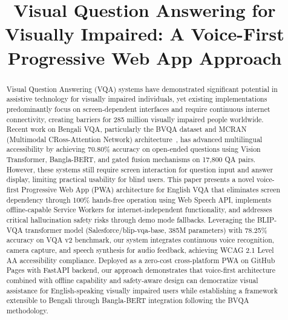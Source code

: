 \documentclass[conference]{IEEEtran}
\begin{document}
\title{Visual Question Answering for Visually Impaired: A Voice-First Progressive Web App Approach}

\author{
\and
{}
}

\maketitle

\begin{abstract}
Visual Question Answering (VQA) systems have demonstrated significant potential in assistive technology for visually impaired individuals, yet existing implementations predominantly focus on screen-dependent interfaces and require continuous internet connectivity, creating barriers for 285 million visually impaired people worldwide. Recent work on Bengali VQA, particularly the BVQA dataset and MCRAN (Multimodal CRoss-Attention Network) architecture~\cite{bvqa_2025}, has advanced multilingual accessibility by achieving 70.80\% accuracy on open-ended questions using Vision Transformer, Bangla-BERT, and gated fusion mechanisms on 17,800 QA pairs. However, these systems still require screen interaction for question input and answer display, limiting practical usability for blind users. This paper presents a novel voice-first Progressive Web App (PWA) architecture for English VQA that eliminates screen dependency through 100\% hands-free operation using Web Speech API, implements offline-capable Service Workers for internet-independent functionality, and addresses critical hallucination safety risks through demo mode fallbacks. Leveraging the BLIP-VQA transformer model (Salesforce/blip-vqa-base, 385M parameters) with 78.25\% accuracy on VQA v2 benchmark, our system integrates continuous voice recognition, camera capture, and speech synthesis for audio feedback, achieving WCAG 2.1 Level AA accessibility compliance. Deployed as a zero-cost cross-platform PWA on GitHub Pages with FastAPI backend, our approach demonstrates that voice-first architecture combined with offline capability and safety-aware design can democratize visual assistance for English-speaking visually impaired users while establishing a framework extensible to Bengali through Bangla-BERT integration following the BVQA methodology.
\end{abstract}
\end{document}
